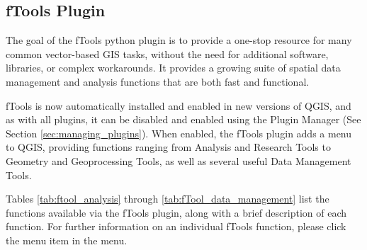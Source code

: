 
\subsection{fTools Plugin}\label{sec:ftools}


The goal of the fTools python plugin is to provide a one-stop resource for
many common vector-based GIS tasks, without the need for additional software, 
libraries, or complex workarounds. It provides a growing suite of spatial 
data management and analysis functions that are both fast and functional. 

fTools is now automatically installed and enabled in new versions of QGIS, and as with all plugins, it can 
be disabled and enabled using the Plugin Manager (See Section \ref{sec:managing_plugins}).
When enabled, the fTools plugin adds a  menu to QGIS, providing functions ranging from 
Analysis and Research Tools to Geometry and Geoprocessing Tools, as well as several useful Data Management Tools.

\label{ftool_functions}

Tables \ref{tab:ftool_analysis} through \ref{tab:fTool_data_management} list the 
functions available via the fTools plugin, along with a brief description of 
each function. For further information on an individual fTools function, please 
click the  menu item in the  menu.

